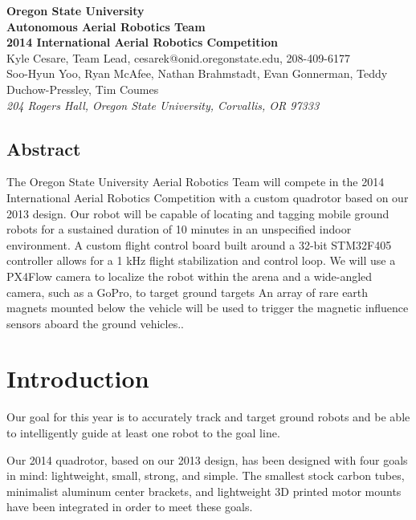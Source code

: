 \documentclass[12pt,letterpaper]{article} \usepackage[margin=1in]{geometry}
\begin{document}
\begin{center}
	{\bf\Large Oregon State University \\
		Autonomous Aerial Robotics Team \\
		2014 International Aerial Robotics Competition \\ [1em]
	}
	{\footnotesize Kyle Cesare, Team Lead, cesarek@onid.oregonstate.edu, 208-409-6177 \\
		Soo-Hyun Yoo, Ryan McAfee, Nathan Brahmstadt, Evan Gonnerman, Teddy Duchow-Pressley, Tim Coumes  \\ [0.5em]
		\emph{204 Rogers Hall, Oregon State University, Corvallis, OR 97333}
	}
\end{center}


\begin{center} \begin{minipage}{5.5in}

\section*{Abstract}

The Oregon State University Aerial Robotics Team will compete in the 2014
International Aerial Robotics Competition with a custom quadrotor based on our
2013 design. Our robot will be capable of locating and tagging mobile ground
robots for a sustained duration of 10 minutes in an unspecified indoor
environment. A custom flight control board built around a 32-bit STM32F405
controller allows for a 1 kHz flight stabilization and control loop. We will
use a PX4Flow camera to localize the robot within the arena and a wide-angled
camera, such as a GoPro, to target ground targets An array of rare earth magnets
mounted below the vehicle will be used to trigger the magnetic influence sensors
aboard the ground vehicles..

\end{minipage} \end{center}



\section*{Introduction}

Our goal for this year is to accurately track and target ground robots and be
able to intelligently guide at least one robot to the goal line.

Our 2014 quadrotor, based on our 2013 design, has been designed with four goals
in mind: lightweight, small, strong, and simple. The smallest stock carbon
tubes, minimalist aluminum center brackets, and lightweight 3D printed motor
mounts have been integrated in order to meet these goals.
\end{document}
